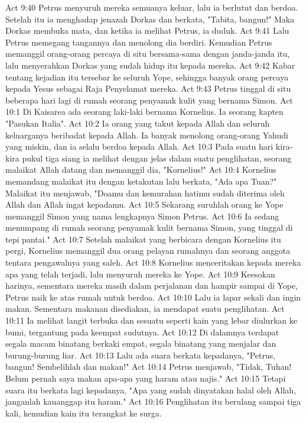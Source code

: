 Act 9:40  Petrus menyuruh mereka semuanya keluar, lalu ia berlutut dan berdoa. Setelah itu ia menghadap jenazah Dorkas dan berkata, "Tabita, bangun!" Maka Dorkas membuka mata, dan ketika ia melihat Petrus, ia duduk.
Act 9:41  Lalu Petrus memegang tangannya dan menolong dia berdiri. Kemudian Petrus memanggil orang-orang percaya di situ bersama-sama dengan janda-janda itu, lalu menyerahkan Dorkas yang sudah hidup itu kepada mereka.
Act 9:42  Kabar tentang kejadian itu tersebar ke seluruh Yope, sehingga banyak orang percaya kepada Yesus sebagai Raja Penyelamat mereka.
Act 9:43  Petrus tinggal di situ beberapa hari lagi di rumah seorang penyamak kulit yang bernama Simon.
Act 10:1  Di Kaisarea ada seorang laki-laki bernama Kornelius. Ia seorang kapten "Pasukan Italia".
Act 10:2  Ia orang yang takut kepada Allah dan seluruh keluarganya beribadat kepada Allah. Ia banyak menolong orang-orang Yahudi yang miskin, dan ia selalu berdoa kepada Allah.
Act 10:3  Pada suatu hari kira-kira pukul tiga siang ia melihat dengan jelas dalam suatu penglihatan, seorang malaikat Allah datang dan memanggil dia, "Kornelius!"
Act 10:4  Kornelius memandang malaikat itu dengan ketakutan lalu berkata, "Ada apa Tuan?" Malaikat itu menjawab, "Doamu dan kemurahan hatimu sudah diterima oleh Allah dan Allah ingat kepadamu.
Act 10:5  Sekarang suruhlah orang ke Yope memanggil Simon yang nama lengkapnya Simon Petrus.
Act 10:6  Ia sedang menumpang di rumah seorang penyamak kulit bernama Simon, yang tinggal di tepi pantai."
Act 10:7  Setelah malaikat yang berbicara dengan Kornelius itu pergi, Kornelius memanggil dua orang pelayan rumahnya dan seorang anggota tentara pengawalnya yang saleh.
Act 10:8  Kornelius menceritakan kepada mereka apa yang telah terjadi, lalu menyuruh mereka ke Yope.
Act 10:9  Keesokan harinya, sementara mereka masih dalam perjalanan dan hampir sampai di Yope, Petrus naik ke atas rumah untuk berdoa.
Act 10:10  Lalu ia lapar sekali dan ingin makan. Sementara makanan disediakan, ia mendapat suatu penglihatan.
Act 10:11  Ia melihat langit terbuka dan sesuatu seperti kain yang lebar diulurkan ke bumi, tergantung pada keempat sudutnya.
Act 10:12  Di dalamnya terdapat segala macam binatang berkaki empat, segala binatang yang menjalar dan burung-burung liar.
Act 10:13  Lalu ada suara berkata kepadanya, "Petrus, bangun! Sembelihlah dan makan!"
Act 10:14  Petrus menjawab, "Tidak, Tuhan! Belum pernah saya makan apa-apa yang haram atau najis."
Act 10:15  Tetapi suara itu berkata lagi kepadanya, "Apa yang sudah dinyatakan halal oleh Allah, janganlah kauanggap itu haram."
Act 10:16  Penglihatan itu berulang sampai tiga kali, kemudian kain itu terangkat ke surga.

